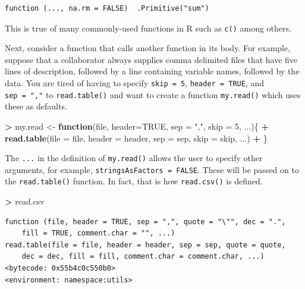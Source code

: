 \documentclass[
]{krantz}
\makeatletter
\newenvironment{Shaded}{\begin{snugshade}}{\end{snugshade}}
\newcommand{\ControlFlowTok}[1]{\textcolor[rgb]{0.27,0.27,0.27}{\textbf{#1}}}
\newcommand{\DataTypeTok}[1]{\textcolor[rgb]{0.27,0.27,0.27}{#1}}
\newcommand{\DecValTok}[1]{\textcolor[rgb]{0.06,0.06,0.06}{#1}}
\newcommand{\KeywordTok}[1]{\textcolor[rgb]{0.27,0.27,0.27}{\textbf{#1}}}
\newcommand{\NormalTok}[1]{#1}
\newcommand{\OperatorTok}[1]{\textcolor[rgb]{0.43,0.43,0.43}{\textbf{#1}}}
\newcommand{\OtherTok}[1]{\textcolor[rgb]{0.37,0.37,0.37}{#1}}
\newcommand{\StringTok}[1]{\textcolor[rgb]{0.5,0.5,0.5}{#1}}
\newenvironment{kframe}{%
\medskip{}
\setlength{\fboxsep}{.8em}
 \def\at@end@of@kframe{}%
 \ifinner\ifhmode%
  \def\at@end@of@kframe{\end{minipage}}%
  \begin{minipage}{\columnwidth}%
 \fi\fi%
 \def\FrameCommand##1{\hskip\@totalleftmargin \hskip-\fboxsep
 \colorbox{shadecolor}{##1}\hskip-\fboxsep
     \hskip-\linewidth \hskip-\@totalleftmargin \hskip\columnwidth}%
 \MakeFramed {\advance\hsize-\width
   \@totalleftmargin\z@ \linewidth\hsize
   \@setminipage}}%
 {\par\unskip\endMakeFramed%
 \at@end@of@kframe}
\renewenvironment{Shaded}{\begin{kframe}}{\end{kframe}}
\makeatother
\begin{document}
\begin{verbatim}
function (..., na.rm = FALSE)  .Primitive("sum")
\end{verbatim}

This is true of many commonly-used functions in R such as \texttt{c()} among others.

Next, consider a function that calls another function in its body. For example, suppose that a collaborator always supplies comma delimited files that have five lines of description, followed by a line containing variable names, followed by the data. You are tired of having to specify \texttt{skip\ =\ 5}, \texttt{header\ =\ TRUE}, and \texttt{sep\ =\ ","} to \texttt{read.table()} and want to create a function \texttt{my.read()} which uses these as defaults.

\begin{Shaded}
\begin{Highlighting}[]
\OperatorTok{\textgreater{}}\StringTok{ }\NormalTok{my.read \textless{}{-}}\StringTok{ }\ControlFlowTok{function}\NormalTok{(file, }\DataTypeTok{header=}\OtherTok{TRUE}\NormalTok{, }\DataTypeTok{sep =} \StringTok{","}\NormalTok{, }\DataTypeTok{skip =} \DecValTok{5}\NormalTok{, ...)\{}
\OperatorTok{+}\StringTok{     }\KeywordTok{read.table}\NormalTok{(}\DataTypeTok{file =}\NormalTok{ file, }\DataTypeTok{header =}\NormalTok{ header, }\DataTypeTok{sep =}\NormalTok{ sep, }\DataTypeTok{skip =}\NormalTok{ skip, ...)}
\OperatorTok{+}\StringTok{ }\NormalTok{\}}
\end{Highlighting}
\end{Shaded}

The \texttt{...} in the definition of \texttt{my.read()} allows the user to specify other arguments, for example, \texttt{stringsAsFactors\ =\ FALSE}. These will be passed on to the \texttt{read.table()} function. In fact, that is how \texttt{read.csv()} is defined.

\begin{Shaded}
\begin{Highlighting}[]
\OperatorTok{\textgreater{}}\StringTok{ }\NormalTok{read.csv}
\end{Highlighting}
\end{Shaded}

\begin{verbatim}
function (file, header = TRUE, sep = ",", quote = "\"", dec = ".", 
    fill = TRUE, comment.char = "", ...) 
read.table(file = file, header = header, sep = sep, quote = quote, 
    dec = dec, fill = fill, comment.char = comment.char, ...)
<bytecode: 0x55b4c0c550b0>
<environment: namespace:utils>
\end{verbatim}
\end{document}
